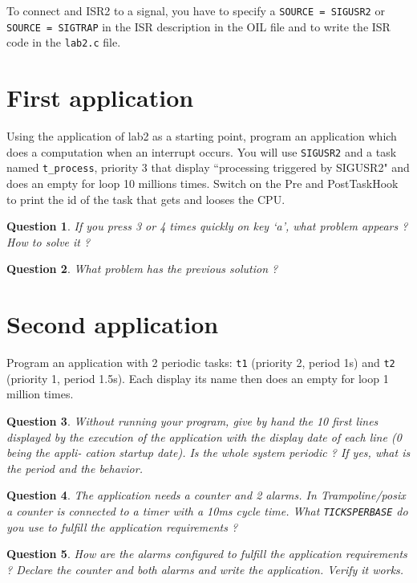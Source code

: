 \documentclass[11pt]{article}
\newtheorem{ex}{Question}
\begin{document}
To connect and ISR2 to a signal, you have to specify a \texttt{SOURCE = SIGUSR2} or \texttt{SOURCE = SIGTRAP} in the ISR description in the OIL file and to write the ISR code in the \texttt{lab2.c} file.

\section{First application}

Using the application of lab2 as a starting point, program an application which does a computation when an interrupt occurs. You will use \texttt{SIGUSR2} and a task named \texttt{t_process}, priority 3 that display ``processing triggered by SIGUSR2" and does an empty for loop 10 millions times. Switch on the Pre and PostTaskHook to print the id of the task that gets and looses the CPU.

\begin{ex}
If you press 3 or 4 times quickly on key `a', what problem appears ? How to solve it ?
\end{ex}
\begin{ex}
What problem has the previous solution ?
\end{ex}

\section{Second application}

Program an application with 2 periodic tasks: \texttt{t1} (priority 2, period 1s) and \texttt{t2} (priority 1, period 1.5s). Each display its name then does an empty for loop 1 million times.

\begin{ex}
Without running your program, give by hand the 10 first lines displayed by the execution of the application with the display date of each line (0 being the appli- cation startup date). Is the whole system periodic ? If yes, what is the period and the behavior.
\end{ex}

\begin{ex}
The application needs a counter and 2 alarms. In Trampoline/posix a counter is connected to a timer with a 10ms cycle time. What \texttt{TICKSPERBASE} do you use to fulfill the application requirements ?
\end{ex}

\begin{ex}
How are the alarms configured to fulfill the application requirements ? Declare the counter and both alarms and write the application. Verify it works.
\end{ex}
\end{document}
